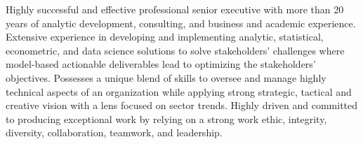 


Highly successful and effective professional senior executive with more than 20 years of analytic development, consulting, and business and academic experience.  Extensive experience in developing and implementing analytic, statistical, econometric, and data science solutions to solve stakeholders' challenges where model-based actionable deliverables lead to optimizing the stakeholders' objectives.  Possesses a unique blend of skills to oversee and manage highly technical aspects of an organization while applying strong strategic, tactical and creative vision with a lens focused on sector trends.  Highly driven and committed to producing exceptional work by relying on a strong work ethic, integrity, diversity, collaboration, teamwork, and leadership.

